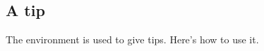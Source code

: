 \documentclass[10pt, a4paper]{article}
\begin{document}
\subsection{A tip}

The  environment is used to give tips. Here's how to use it.

\end{document}
